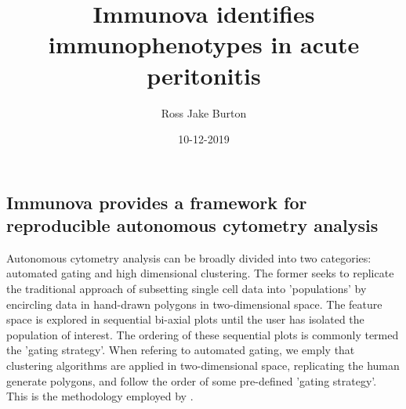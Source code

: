 \documentclass{article}
\begin{document}
\title{Immunova identifies immunophenotypes in acute peritonitis}
\date{10-12-2019}
\author{Ross Jake Burton}

\maketitle
\newpage
{}

\begin{flushleft}
\section{Immunova provides a framework for reproducible autonomous cytometry analysis}
	
Autonomous cytometry analysis can be broadly divided into two categories: automated gating 	
and high dimensional clustering. The former seeks to replicate the traditional approach of subsetting single cell data into 'populations' by encircling data in hand-drawn polygons in two-dimensional space. The feature space is explored in sequential bi-axial plots until the user has isolated the population of interest. The ordering of these sequential plots is commonly termed the 'gating strategy'. When refering to automated gating, we emply that clustering algorithms are applied in two-dimensional space, replicating the human generate polygons, and follow the order of some pre-defined 'gating strategy'. This is the methodology employed by \cite{opencyto}.
\end{flushleft}
\end{document}
